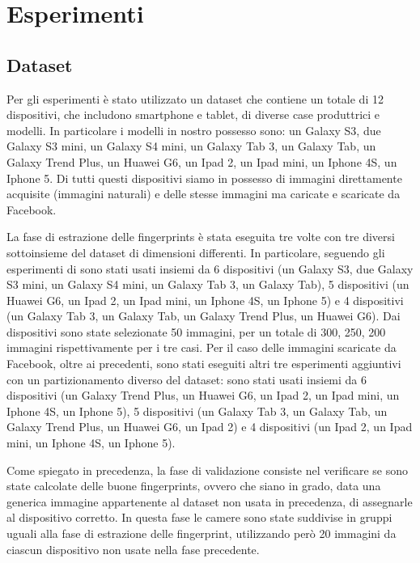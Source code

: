 \section{Esperimenti}

\subsection{Dataset}

Per gli esperimenti è stato utilizzato un dataset che contiene un totale di 12 dispositivi, che includono smartphone e tablet, di diverse case produttrici e modelli. In particolare i modelli in nostro possesso sono: un Galaxy S3, due Galaxy S3 mini, un Galaxy S4 mini, un Galaxy Tab 3, un Galaxy Tab, un Galaxy Trend Plus, un Huawei G6, un Ipad 2, un Ipad mini, un Iphone 4S, un Iphone 5. Di tutti questi dispositivi siamo in possesso di immagini direttamente acquisite (immagini naturali) e delle stesse immagini ma caricate e scaricate da Facebook.

La fase di estrazione delle fingerprints è stata eseguita tre volte con tre diversi sottoinsieme del dataset di dimensioni differenti. In particolare, seguendo gli esperimenti di \cite{ Amerini2014831} sono stati usati insiemi da 6 dispositivi (un Galaxy S3, due Galaxy S3 mini, un Galaxy S4 mini, un Galaxy Tab 3, un Galaxy Tab), 5 dispositivi (un Huawei G6, un Ipad 2, un Ipad mini, un Iphone 4S, un Iphone 5) e 4 dispositivi (un Galaxy Tab 3, un Galaxy Tab, un Galaxy Trend Plus, un Huawei G6). Dai dispositivi sono state selezionate 50 immagini, per un totale di 300, 250, 200 immagini rispettivamente per i tre casi.
Per il caso delle immagini scaricate da Facebook, oltre ai precedenti, sono stati eseguiti altri tre esperimenti aggiuntivi con un partizionamento diverso del dataset: sono stati usati insiemi da 6 dispositivi (un Galaxy Trend Plus, un Huawei G6, un Ipad 2, un Ipad mini, un Iphone 4S, un Iphone 5), 5 dispositivi (un Galaxy Tab 3, un Galaxy Tab, un Galaxy Trend Plus, un Huawei G6, un Ipad 2) e 4 dispositivi (un Ipad 2, un Ipad mini, un Iphone 4S, un Iphone 5).

Come spiegato in precedenza, la fase di validazione consiste nel verificare se sono state calcolate delle buone fingerprints, ovvero che siano in grado, data una generica immagine appartenente al dataset non usata in precedenza, di assegnarle al dispositivo corretto. In questa fase le camere sono state suddivise in gruppi uguali alla fase di estrazione delle fingerprint, utilizzando però 20 immagini da ciascun dispositivo non usate nella fase precedente.

